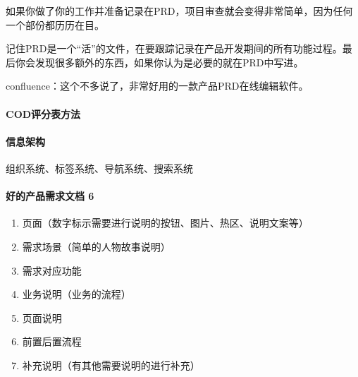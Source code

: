 \documentclass[letterpaper,10pt,english]{sphinxmanual}
\begin{document}
如果你做了你的工作并准备记录在PRD，项目审查就会变得非常简单，因为任何一个部份都历历在目。

记住PRD是一个“活”的文件，在要跟踪记录在产品开发期间的所有功能过程。最后你会发现很多额外的东西，如果你认为是必要的就在PRD中写进。

confluence：这个不多说了，非常好用的一款产品PRD在线编辑软件。%
\begin{footnote}[573]\sphinxAtStartFootnote
{}
%
\end{footnote}


\paragraph{COD评分表方法}
\label{\detokenize{chapter_knowledge/PRD:cod}}

\paragraph{信息架构}
\label{\detokenize{chapter_knowledge/PRD:id27}}
组织系统、标签系统、导航系统、搜索系统


\paragraph{好的产品需求文档 6\sphinxfootnotemark[574]}
\label{\detokenize{chapter_knowledge/PRD:id28}}%
\begin{footnotetext}[574]\sphinxAtStartFootnote
{}
%
\end{footnotetext}\ignorespaces \begin{enumerate}
%
\item {} 
页面（数字标示需要进行说明的按钮、图片、热区、说明文案等）

\item {} 
需求场景（简单的人物故事说明）

\item {} 
需求对应功能

\item {} 
业务说明（业务的流程）

\item {} 
页面说明

\item {} 
前置后置流程

\item {} 
补充说明（有其他需要说明的进行补充）

\end{enumerate}
\end{document}
